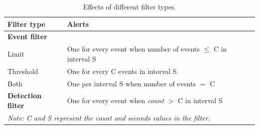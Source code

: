 \begin{table}[htb]
  \centering
  \begin{tabular}{l|l}
  	Filter type & Alerts \\
    \hline
	\textbf{Event filter} \\
	Limit & One for every event when number of events \(\leq\) C in interval S\\
	Threshold & One for every C events in interval S \\
	Both & One per interval S when number of events \(=\) C\\
	\hline
	\textbf{Detection filter} & One for every event when \textit{count} \(>\) C in
	interval S\\
	\hline
	\multicolumn{2}{l}{\textit{Note: C and S represent the \em count \em and \em
	seconds \em values in the filter.}}\\
  \end{tabular}
  \caption{Effects of different filter types.}
  \label{tab:filterTypes}
\end{table}